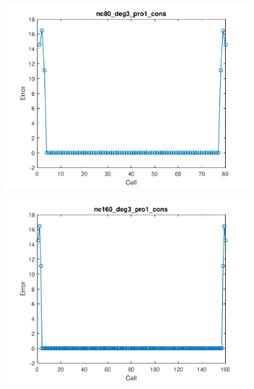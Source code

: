 \documentclass[11pt,a4paper]{article}
\theoremstyle{plain}
\theoremstyle{definition}
\begin{document}
\begin{figure}[H]
\medskip
\begin{subfigure}[b]{0.48\textwidth}
\includegraphics[width=\linewidth]{../../tests_01_01/test_01_01_test9_pro1_cons/output/plots/nc80_deg3_wei111_pro1_cons.pdf}
\end{subfigure}\hspace*{\fill}
\begin{subfigure}[b]{0.48\textwidth}
\includegraphics[width=\linewidth]{../../tests_01_01/test_01_01_test9_pro1_cons/output/plots/nc160_deg3_wei111_pro1_cons.pdf}
\end{subfigure}


\end{figure}
\end{document}
